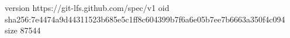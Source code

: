 version https://git-lfs.github.com/spec/v1
oid sha256:7e4474a9d44311523b685e5c1ff8c604399b7f6a6e05b7ee7b6663a350f4c094
size 87544
